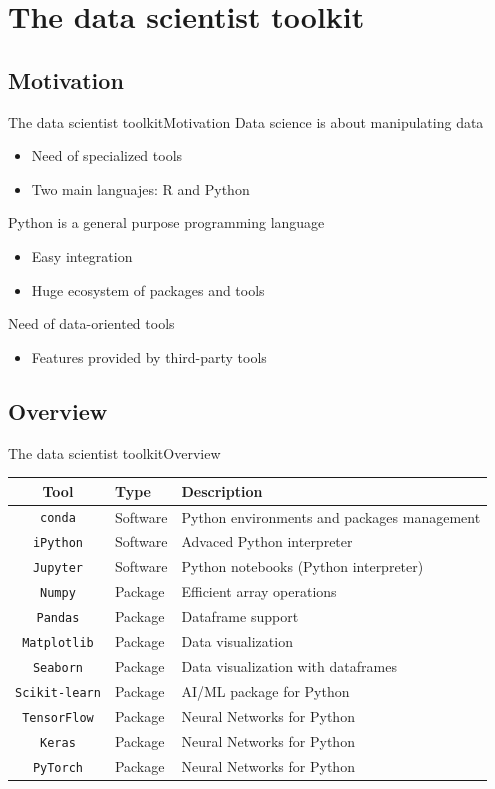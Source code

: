 \documentclass[10pt,compress]{beamer} %
\begin{document}
\section{The data scientist toolkit}

\subsection{Motivation}

\begin{frame}{The data scientist toolkit}{Motivation}
	Data science is about manipulating data
	\begin{itemize}
		\item Need of specialized tools
		\item Two main languajes: R and Python
	\end{itemize}
	Python is a general purpose programming language
	\begin{itemize}
		\item Easy integration 
		\item Huge ecosystem of packages and tools
	\end{itemize}
	Need of data-oriented tools
	\begin{itemize}
		\item Features provided by third-party tools
	\end{itemize}
\end{frame}

\subsection{Overview}

\begin{frame}{The data scientist toolkit}{Overview}
   \begin{tabular}{cll}\hline
       \textbf{Tool}& \textbf{Type} & \textbf{Description}\\ \hline
	   \texttt{conda} 	& Software & Python environments and packages management \\
	   \texttt{iPython} & Software & Advaced Python interpreter \\
	   \texttt{Jupyter} & Software & Python notebooks (Python interpreter) \\
	   \texttt{Numpy}   & Package  & Efficient array operations \\
	   \texttt{Pandas}  & Package  & Dataframe support \\
	   \texttt{Matplotlib} & Package & Data visualization \\
	   \texttt{Seaborn} & Package & Data visualization with dataframes \\
	   \texttt{Scikit-learn} & Package & AI/ML package for Python \\\hline
	   \texttt{TensorFlow} & Package & Neural Networks for Python \\
	   \texttt{Keras} & Package & Neural Networks for Python \\
	   \texttt{PyTorch} & Package & Neural Networks for Python \\
	   \hline
   \end{tabular}
\end{frame}
\end{document}
